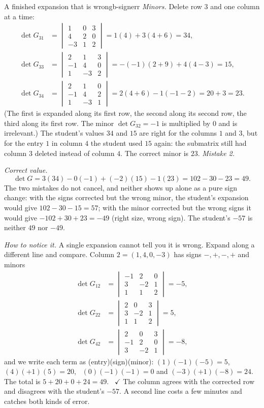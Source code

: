 \documentclass[11pt]{article}
\begin{document}
\begin{exmp}{A finished expansion that is wrong}{b-signerr}
\emph{Minors.} Delete row $3$ and one column at a time:
\begin{align*}
\det G_{31}&=\begin{vmatrix}1&0&3\\4&2&0\\-3&1&2\end{vmatrix}=1(4)+3(4+6)=34,\\
\det G_{33}&=\begin{vmatrix}2&1&3\\-1&4&0\\1&-3&2\end{vmatrix}=-(-1)(2+9)+4(4-3)=15,\\
\det G_{34}&=\begin{vmatrix}2&1&0\\-1&4&2\\1&-3&1\end{vmatrix}=2(4+6)-1(-1-2)=20+3=23.
\end{align*}
(The first is expanded along its first row, the second along its second row, the third along its first row. The minor $\det G_{32}=-1$ is multiplied by $0$ and is irrelevant.) The student's values $34$ and $15$ are right for the columns $1$ and $3$, but for the entry $1$ in column $4$ the student used $15$ again: the submatrix still had column $3$ deleted instead of column $4$. The correct minor is $23$. \emph{Mistake 2.}

\emph{Correct value.}
\[
\det G=3(34)-0(-1)+(-2)(15)-1(23)=102-30-23=49.
\]
The two mistakes do not cancel, and neither shows up alone as a pure sign change: with the signs corrected but the wrong minor, the student's expansion would give $102-30-15=57$; with the minor corrected but the wrong signs it would give $-102+30+23=-49$ (right size, wrong sign). The student's $-57$ is neither $49$ nor $-49$.

\emph{How to notice it.} A single expansion cannot tell you it is wrong. Expand along a different line and compare. Column $2=(1,4,0,-3)$ has signs $-,+,-,+$ and minors
\begin{align*}
\det G_{12}&=\begin{vmatrix}-1&2&0\\3&-2&1\\1&1&2\end{vmatrix}=-5,\\
\det G_{22}&=\begin{vmatrix}2&0&3\\3&-2&1\\1&1&2\end{vmatrix}=5,\\
\det G_{42}&=\begin{vmatrix}2&0&3\\-1&2&0\\3&-2&1\end{vmatrix}=-8,
\end{align*}
and we write each term as (entry)(sign)(minor): $(1)(-1)(-5)=5$, \ $(4)(+1)(5)=20$, \ $(0)(-1)(-1)=0$ and $(-3)(+1)(-8)=24$. The total is $5+20+0+24=49$. \ $\checkmark$ The column agrees with the corrected row and disagrees with the student's $-57$. A second line costs a few minutes and catches both kinds of error.
\end{exmp}
\end{document}
